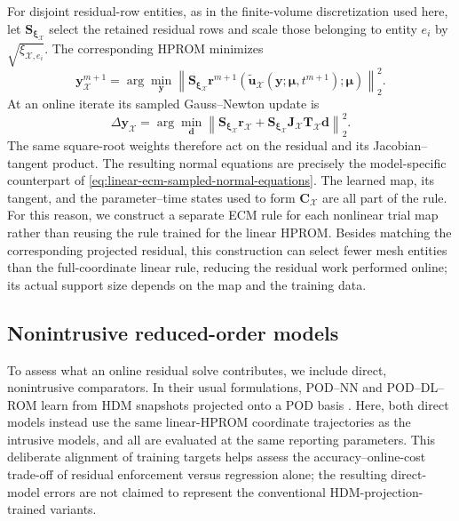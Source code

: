 \documentclass[11pt]{article}
\newcommand{\utilde}{\widetilde{\mathbf u}}
\newcommand{\mub}{\bm\mu}
\newcommand{\norm}[1]{\left\lVert #1 \right\rVert}
\begin{document}
For disjoint residual-row entities, as in the finite-volume discretization
used here, let $\mathbf S_{\boldsymbol\xi_{\mathcal X}}$ select the retained
residual rows and scale those belonging to entity $e_i$ by
$\sqrt{\xi_{\mathcal X,e_i}}$.  The corresponding HPROM minimizes
\begin{equation}
\mathbf y_{\mathcal X}^{m+1}=\arg\min_{\mathbf y}
\norm{\mathbf S_{\boldsymbol\xi_{\mathcal X}}\mathbf r^{m+1}
(\utilde_{\mathcal X}(\mathbf y;\mub,t^{m+1});\mub)}_2^2.
\label{eq:learned-hprom-objective}
\end{equation}
At an online iterate its sampled Gauss--Newton update is
\begin{equation}
\Delta\mathbf y_{\mathcal X}
=\arg\min_{\mathbf d}
\norm{
\mathbf S_{\boldsymbol\xi_{\mathcal X}}\mathbf r_{\mathcal X}
+\mathbf S_{\boldsymbol\xi_{\mathcal X}}
\mathbf J_{\mathcal X}\mathbf T_{\mathcal X}\mathbf d}_2^2.
\label{eq:generic-learned-hprom-gn}
\end{equation}
The same square-root weights therefore act on the residual and its
Jacobian--tangent product.  The resulting normal equations are precisely the
model-specific counterpart of
\eqref{eq:linear-ecm-sampled-normal-equations}.  The learned map, its tangent,
and the parameter--time states used to form $\mathbf C_{\mathcal X}$ are all
part of the rule.  For this reason, we construct a separate ECM rule for
each nonlinear trial map rather than reusing the rule trained for the
linear HPROM.  Besides matching the corresponding projected residual,
this construction can select fewer mesh entities than the full-coordinate
linear rule, reducing the residual work performed online; its actual
support size depends on the map and the training data.

\subsection{Nonintrusive reduced-order models}
To assess what an online residual solve contributes, we include direct,
nonintrusive comparators.  In their usual formulations, POD--NN and
POD--DL--ROM learn from HDM snapshots projected onto a POD basis
\cite{hesthaven2018non,fresca2022pod}.  Here, both direct models instead
use the same linear-HPROM coordinate trajectories as the intrusive models,
and all are evaluated at the same reporting parameters.  This deliberate
alignment of training targets helps assess the accuracy--online-cost
trade-off of residual enforcement versus regression alone; the resulting
direct-model errors are not claimed to represent the conventional
HDM-projection-trained variants.
\end{document}

